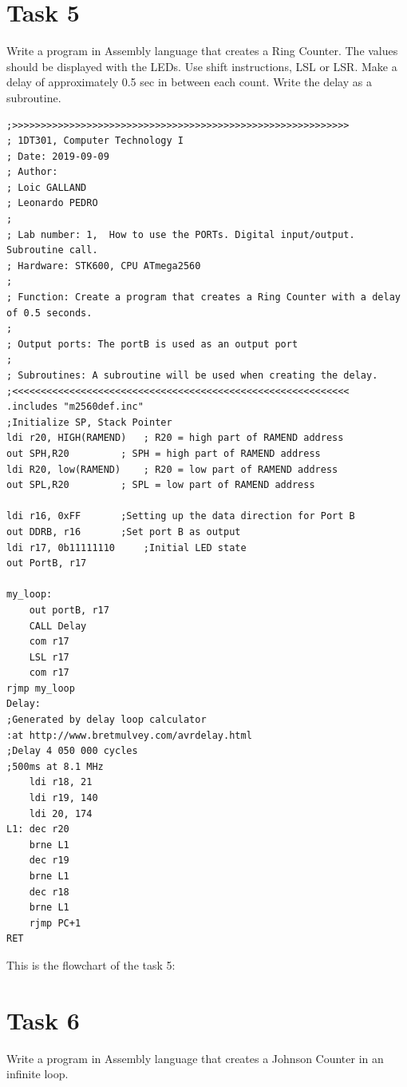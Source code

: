 \documentclass[a4paper,12pt]{article}
\begin{document}
\section{Task 5}
Write a program in Assembly language that creates a Ring Counter. The values should be
displayed with the LEDs. Use shift instructions, LSL or LSR.
Make a delay of approximately 0.5 sec in between each count. Write the delay as a
subroutine.
\lstset{style=Asm}
\begin{lstlisting}
;>>>>>>>>>>>>>>>>>>>>>>>>>>>>>>>>>>>>>>>>>>>>>>>>>>>>>>>>>>>
; 1DT301, Computer Technology I
; Date: 2019-09-09
; Author:
; Loic GALLAND
; Leonardo PEDRO
;
; Lab number: 1,  How to use the PORTs. Digital input/output. Subroutine call.
; Hardware: STK600, CPU ATmega2560
;
; Function: Create a program that creates a Ring Counter with a delay of 0.5 seconds. 
;
; Output ports: The portB is used as an output port
;
; Subroutines: A subroutine will be used when creating the delay. 
;<<<<<<<<<<<<<<<<<<<<<<<<<<<<<<<<<<<<<<<<<<<<<<<<<<<<<<<<<<<
.includes "m2560def.inc"
;Initialize SP, Stack Pointer
ldi r20, HIGH(RAMEND)	; R20 = high part of RAMEND address
out SPH,R20 		; SPH = high part of RAMEND address
ldi R20, low(RAMEND) 	; R20 = low part of RAMEND address
out SPL,R20 		; SPL = low part of RAMEND address

ldi r16, 0xFF 		;Setting up the data direction for Port B
out DDRB, r16 		;Set port B as output
ldi r17, 0b11111110 	;Initial LED state
out PortB, r17

my_loop:
	out portB, r17
	CALL Delay
	com r17
	LSL r17
	com r17
rjmp my_loop
Delay:
;Generated by delay loop calculator
:at http://www.bretmulvey.com/avrdelay.html
;Delay 4 050 000 cycles
;500ms at 8.1 MHz
	ldi r18, 21
	ldi r19, 140
	ldi 20, 174
L1:	dec r20
	brne L1
	dec r19
	brne L1
	dec r18
	brne L1
	rjmp PC+1
RET
\end{lstlisting}
\newpage
This is the flowchart of the task 5:
\begin{center}
\end{center}
\newpage
\section{Task 6}
Write a program in Assembly language that creates a Johnson Counter in an infinite loop.
\end{document}
